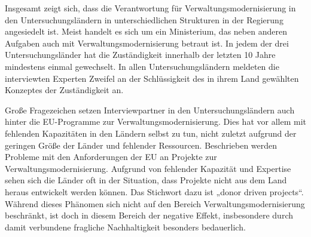 Insgesamt zeigt sich, dass die Verantwortung für Verwaltungsmodernisierung in den Untersuchungsländern in unterschiedlichen Strukturen in der Regierung angesiedelt ist. Meist handelt es sich um ein Ministerium, das neben anderen Aufgaben auch mit Verwaltungsmodernisierung betraut ist. In jedem der drei Untersuchungsländer hat die Zuständigkeit innerhalb der letzten 10 Jahre mindestens einmal gewechselt. In allen Untersuchungsländern meldeten die interviewten Experten Zweifel an der Schlüssigkeit des in ihrem Land gewählten Konzeptes der Zuständigkeit an. 
\par
Große Fragezeichen setzen Interviewpartner in den Untersuchungsländern auch hinter die EU-Programme zur Verwaltungsmodernisierung. Dies hat vor allem mit fehlenden Kapazitäten in den Ländern selbst zu tun, nicht zuletzt aufgrund der geringen Größe der Länder und fehlender Ressourcen. Beschrieben werden Probleme mit den Anforderungen der EU an Projekte zur Verwaltungsmodernisierung. Aufgrund von fehlender Kapazität und Expertise sehen sich die Länder oft in der Situation, dass Projekte nicht aus dem Land heraus entwickelt werden können. Das Stichwort dazu ist „donor driven projects“. Während dieses Phänomen sich nicht auf den Bereich Verwaltungsmodernisierung beschränkt, ist doch in diesem Bereich der negative Effekt, insbesondere durch damit verbundene fragliche Nachhaltigkeit besonders bedauerlich.
